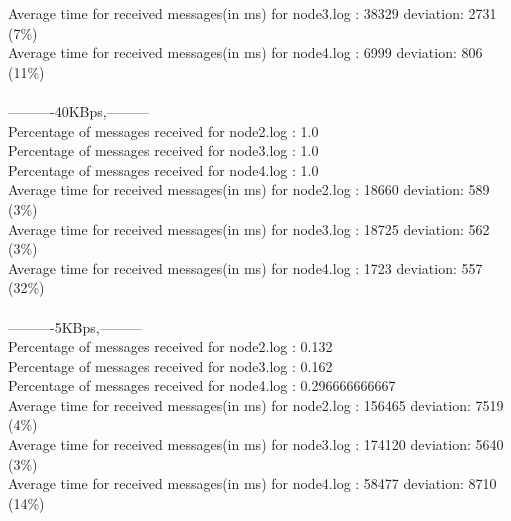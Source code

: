         Average time for received messages(in ms) for  node3.log : 38329    deviation: 2731 (7\%)\\
        Average time for received messages(in ms) for  node4.log : 6999     deviation: 806 (11\%)\\\\
        ----------40KBps,---------\\
        Percentage of messages received for node2.log : 1.0\\
        Percentage of messages received for node3.log : 1.0\\
        Percentage of messages received for node4.log : 1.0\\
        Average time for received messages(in ms) for  node2.log : 18660    deviation: 589 (3\%)\\
        Average time for received messages(in ms) for  node3.log : 18725    deviation: 562 (3\%)\\
        Average time for received messages(in ms) for  node4.log : 1723     deviation: 557 (32\%)\\\\
        ----------5KBps,---------\\
        Percentage of messages received for node2.log : 0.132\\
        Percentage of messages received for node3.log : 0.162\\
        Percentage of messages received for node4.log : 0.296666666667\\
        Average time for received messages(in ms) for  node2.log : 156465   deviation: 7519 (4\%)\\
        Average time for received messages(in ms) for  node3.log : 174120   deviation: 5640 (3\%)\\
        Average time for received messages(in ms) for  node4.log : 58477    deviation: 8710 (14\%)\\\\
